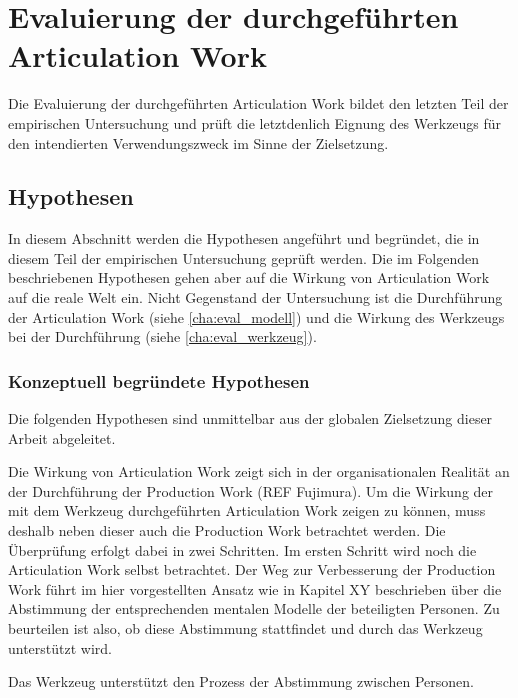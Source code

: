 \chapter{Evaluierung der durchgeführten Articulation Work} %
\label{cha:eval_aw}

Die Evaluierung der durchgeführten Articulation Work bildet den letzten Teil der empirischen Untersuchung und prüft die letztdenlich Eignung des Werkzeugs für den intendierten Verwendungszweck im Sinne der Zielsetzung. 

\section{Hypothesen} %
\label{sec:a_hypothesen}

In diesem Abschnitt werden die Hypothesen angeführt und begründet, die in diesem Teil der empirischen Untersuchung geprüft werden. Die im Folgenden beschriebenen Hypothesen gehen aber auf die Wirkung von Articulation Work auf die reale Welt ein. Nicht Gegenstand der Untersuchung ist die Durchführung der Articulation Work (siehe \ref{cha:eval_modell}) und die Wirkung des Werkzeugs bei der Durchführung (siehe \ref{cha:eval_werkzeug}).

\subsection{Konzeptuell begründete Hypothesen} %
\label{sub:a_konzeptionell_begründete_hypothesen}

Die folgenden Hypothesen sind unmittelbar aus der globalen Zielsetzung dieser Arbeit abgeleitet.

Die Wirkung von Articulation Work zeigt sich in der organisationalen Realität an der Durchführung der Production Work (REF Fujimura). Um die Wirkung der mit dem Werkzeug durchgeführten Articulation Work zeigen zu können, muss deshalb neben dieser auch die Production Work betrachtet werden. Die Überprüfung erfolgt dabei in zwei Schritten. Im ersten Schritt wird noch die Articulation Work selbst betrachtet. Der Weg zur Verbesserung der Production Work führt im hier vorgestellten Ansatz wie in Kapitel XY beschrieben über die Abstimmung der entsprechenden mentalen Modelle der beteiligten Personen. Zu beurteilen ist also, ob diese Abstimmung stattfindet und durch das Werkzeug unterstützt wird. 

\begin{hyp}
	\label{hyp:abstimmung}
	Das Werkzeug unterstützt den Prozess der Abstimmung zwischen Personen.
\end{hyp}

